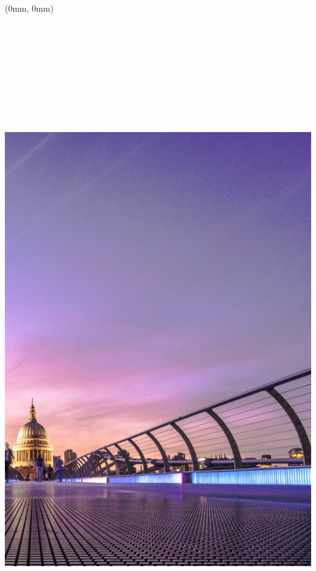 \documentclass[
  a4paper,
  twoside, 11pt]{article}
\author{}
\date{\vspace{-2.5em}}
\begin{document}
\frenchspacing

\raggedright

\raggedbottom

\begin{textblock*}{21cm}(0mm, 0mm)
\includegraphics[width=21cm,height=29.7cm]{cover_image_2020_q3.jpg}
\end{textblock*}
\end{document}
